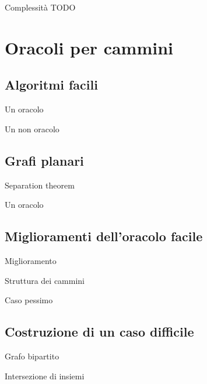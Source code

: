 \documentclass{beamer}
\theoremstyle{plain}
\theoremstyle{definition}
\theoremstyle{remark}
\begin{document}
\begin{frame}{Complessità}
  TODO
\end{frame}


\section{Oracoli per cammini}

\subsection{Algoritmi facili}

\begin{frame}{Un oracolo}
  
\end{frame}

\begin{frame}{Un non oracolo}
  
\end{frame}

\subsection{Grafi planari}

\begin{frame}{Separation theorem}
  
\end{frame}

\begin{frame}{Un oracolo}
  
\end{frame}

\subsection{Miglioramenti dell'oracolo facile}

\begin{frame}{Miglioramento}
  
\end{frame}

\begin{frame}{Struttura dei cammini}
  
\end{frame}

\begin{frame}{Caso pessimo}
  
\end{frame}

\subsection{Costruzione di un caso difficile}

\begin{frame}{Grafo bipartito}
  
\end{frame}

\begin{frame}{Intersezione di insiemi}
  
\end{frame}
\end{document}
